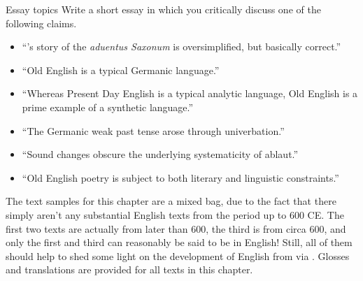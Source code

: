 \begin{exercises}{Essay topics}
Write a short essay in which you critically discuss one of the following claims.

\begin{itemize}
    \item ``'s story of the \emph{aduentus Saxonum} is oversimplified, but basically correct.''
    \item ``Old English is a typical Germanic language.''
    \item ``Whereas Present Day English is a typical analytic language, Old English is a prime example of a synthetic language.''
    \item ``The Germanic weak past tense arose through univerbation.''
    \item ``Sound changes obscure the underlying systematicity of ablaut.''
    \item ``Old English poetry is subject to both literary and linguistic constraints.''
\end{itemize}
\end{exercises}

\noindent The text samples for this chapter are a mixed bag, due to the fact that there simply aren't any substantial English texts from the period up to 600 CE. The first two texts are actually from later than 600, the third is from circa 600, and only the first and third can reasonably be said to be in English! Still, all of them should help to shed some light on the development of English from  via . Glosses and translations are provided for all texts in this chapter.

